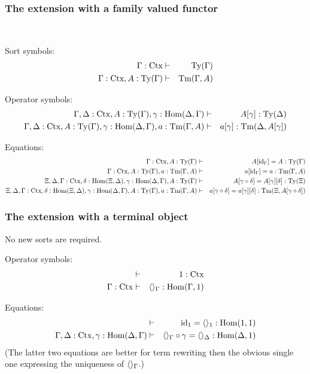 \documentclass{lmcs}
\def\Ctx{\mathrm{Ctx}}
\def\Hom{\mathrm{Hom}}
\def\id{\mathrm{id}}
\begin{document}
\subsubsection{The extension with a family valued functor}
\mbox{ }

Sort symbols:
\begin{eqnarray*}
\Gamma : \Ctx &\vdash& \Ty(\Gamma)\\
\Gamma : \Ctx, A:\Ty(\Gamma) &\vdash& \Tm(\Gamma,A)
\end{eqnarray*}

Operator symbols:
\begin{eqnarray*}
\Gamma,\Delta : \Ctx, A:\Ty(\Gamma), \gamma : \Hom(\Delta,\Gamma) &\vdash& 
A[\gamma] : \Ty(\Delta)\\
\Gamma,\Delta : \Ctx, A:\Ty(\Gamma), \gamma : \Hom(\Delta,\Gamma), a:\Tm(\Gamma,A) &\vdash&  a[\gamma] : \Tm(\Delta,A[\gamma])
\end{eqnarray*}

Equations:
\begin{eqnarray*}
\Gamma : \Ctx, A:\Ty(\Gamma) &\vdash& A[\id_\Gamma] = A : \Ty(\Gamma)\\
\Gamma : \Ctx, A:\Ty(\Gamma), a:\Tm(\Gamma,A) &\vdash& a[\id_\Gamma] = a : \Tm(\Gamma,A)\\
\Xi,\Delta,\Gamma : \Ctx, \delta : \Hom(\Xi,\Delta), \gamma : \Hom(\Delta,\Gamma),
A:\Ty(\Gamma) &\vdash& A[\gamma\circ\delta] = A[\gamma][\delta]: \Ty(\Xi)\\
\Xi,\Delta,\Gamma : \Ctx, \delta : \Hom(\Xi,\Delta), \gamma : \Hom(\Delta,\Gamma),
A:\Ty(\Gamma), a:\Tm(\Gamma,A) &\vdash& 
a[\gamma\circ\delta] = a[\gamma][\delta]: \Tm(\Xi,A[\gamma\circ\delta])
\end{eqnarray*}

\subsubsection{The extension with a terminal object}
No new sorts are required.
  
Operator symbols:
\begin{eqnarray*}
&\vdash& 1 : \Ctx\\
\Gamma : \Ctx &\vdash& \tuple{}_\Gamma : \Hom(\Gamma,1)
\end{eqnarray*}

Equations:
\begin{eqnarray*}
 &\vdash& \id_1 = \tuple{}_1 : \Hom(1,1)\\
\Gamma,\Delta : \Ctx, \gamma : \Hom(\Delta,\Gamma) &\vdash& 
\tuple{}_\Gamma\circ\gamma = \tuple{}_\Delta : \Hom(\Delta,1)
\end{eqnarray*}
(The latter two equations are better for term rewriting then the
obvious single one expressing the uniqueness of $\langle  \rangle_\Gamma$.)
\end{document}
